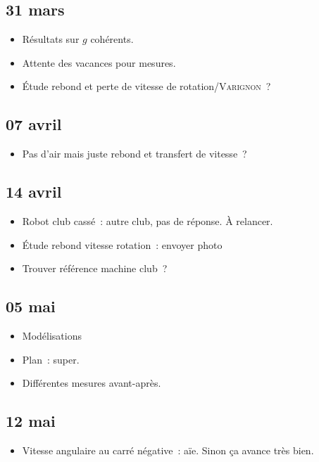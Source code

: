 \documentclass[a4paper, 11pt, final, garamond]{book}
\begin{document}
\subsection{31 mars}
\begin{itemize}
  \item Résultats sur $g$ cohérents.
  \item Attente des vacances pour mesures.
  \item Étude rebond et perte de vitesse de rotation/\textsc{Varignon}~?
\end{itemize}

\subsection{07 avril}
\begin{itemize}
  \item Pas d'air mais juste rebond et transfert de vitesse~?
\end{itemize}

\subsection{14 avril}
\begin{itemize}
  \item Robot club cassé~: autre club, pas de réponse. À relancer.
  \item Étude rebond vitesse rotation~: envoyer photo
  \item Trouver référence machine club~?
\end{itemize}

\subsection{05 mai}
\begin{itemize}
  \item Modélisations
  \item{Plan}~: super.
  \item Différentes mesures avant-après.
\end{itemize}

\subsection{12 mai}
\begin{itemize}
  \item Vitesse angulaire au carré négative~: aïe. Sinon ça avance très bien.
\end{itemize}
\end{document}
